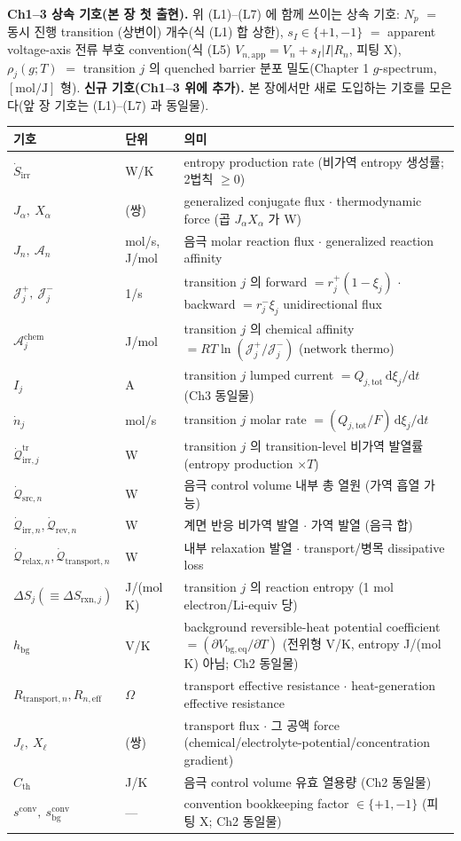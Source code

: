 \documentclass[11pt,a4paper]{article}
\newcommand{\dd}{\mathrm{d}}
\newcommand{\eff}{\mathrm{eff}}
\newcommand{\eq}{\mathrm{eq}}
\newcommand{\app}{\mathrm{app}}
\newcommand{\bg}{\mathrm{bg}}
\newcommand{\tot}{\mathrm{tot}}
\newcommand{\irr}{\mathrm{irr}}
\newcommand{\rev}{\mathrm{rev}}
\newcommand{\rxn}{\mathrm{rxn}}
\newcommand{\src}{\mathrm{src}}
\newcommand{\rlx}{\mathrm{relax}}
\newcommand{\conv}{\mathrm{conv}}
\newcommand{\transp}{\mathrm{transport}}
\newcommand{\tr}{\mathrm{tr}}
\newcommand{\chem}{\mathrm{chem}}
\begin{document}
\textbf{Ch1--3 상속 기호(본 장 첫 출현).} 위 (L1)--(L7) 에 함께 쓰이는 상속 기호: $N_p$ $=$ 동시 진행 transition
(상변이) 개수(식 (L1) 합 상한), $s_I\in\{+1,-1\}$ $=$ apparent voltage-axis 전류 부호 convention(식 (L5)
$V_{n,\app}=V_n+s_I|I|R_n$, 피팅 X), $\rho_j(g;T)$ $=$ transition $j$ 의 quenched barrier 분포 밀도(Chapter 1
$g$-spectrum, $[\mathrm{mol/J}]$ 형). \textbf{신규 기호(Ch1--3 위에 추가).} 본 장에서만 새로 도입하는 기호를 모은다(앞 장 기호는 (L1)--(L7) 과 동일물).
\begin{longtable}{p{} p{} >{\raggedright\arraybackslash}p{}}
\toprule 기호 & 단위 & 의미 \\ \midrule \endhead
$\dot S_\irr$ & W/K & entropy production rate (비가역 entropy 생성률; 2법칙 $\ge0$) \\
$J_\alpha,\ X_\alpha$ & (쌍) & generalized conjugate flux $\cdot$ thermodynamic force (곱 $J_\alpha X_\alpha$ 가 W) \\
$J_n,\ \mathcal A_n$ & mol/s, J/mol & 음극 molar reaction flux $\cdot$ generalized reaction affinity \\
$\mathcal J_j^+,\ \mathcal J_j^-$ & 1/s & transition $j$ 의 forward $=r_j^+(1-\xi_j)$ $\cdot$ backward $=r_j^-\xi_j$ unidirectional flux \\
$\mathcal A_j^{\chem}$ & J/mol & transition $j$ 의 chemical affinity $=RT\ln(\mathcal J_j^+/\mathcal J_j^-)$ (network thermo) \\
$I_j$ & A & transition $j$ lumped current $=Q_{j,\tot}\,\dd\xi_j/\dd t$ (Ch3 동일물) \\
$\dot n_j$ & mol/s & transition $j$ molar rate $=(Q_{j,\tot}/F)\,\dd\xi_j/\dd t$ \\
$\dot{\mathcal Q}_{\irr,j}^{\tr}$ & W & transition $j$ 의 transition-level 비가역 발열률 (entropy production $\times T$) \\
$\dot{\mathcal Q}_{\src,n}$ & W & 음극 control volume 내부 총 열원 (가역 흡열 가능) \\
$\dot{\mathcal Q}_{\irr,n},\dot{\mathcal Q}_{\rev,n}$ & W & 계면 반응 비가역 발열 $\cdot$ 가역 발열 (음극 합) \\
$\dot{\mathcal Q}_{\rlx,n},\dot{\mathcal Q}_{\transp,n}$ & W & 내부 relaxation 발열 $\cdot$ transport/병목 dissipative loss \\
$\Delta S_j(\equiv\Delta S_{\rxn,j})$ & J/(mol K) & transition $j$ 의 reaction entropy (1 mol electron/Li-equiv 당) \\
$h_\bg$ & V/K & background reversible-heat potential coefficient $=(\partial V_{\bg,\eq}/\partial T)$ (전위형 V/K, entropy J/(mol K) 아님; Ch2 동일물) \\
$R_{\transp,n},R_{n,\eff}$ & $\Omega$ & transport effective resistance $\cdot$ heat-generation effective resistance \\
$J_\ell,\ X_\ell$ & (쌍) & transport flux $\cdot$ 그 공액 force (chemical/electrolyte-potential/concentration gradient) \\
$C_{\mathrm{th}}$ & J/K & 음극 control volume 유효 열용량 (Ch2 동일물) \\
$s^{\conv},\ s_\bg^\conv$ & --- & convention bookkeeping factor $\in\{+1,-1\}$ (피팅 X; Ch2 동일물) \\
\bottomrule
\end{longtable}
\end{document}
